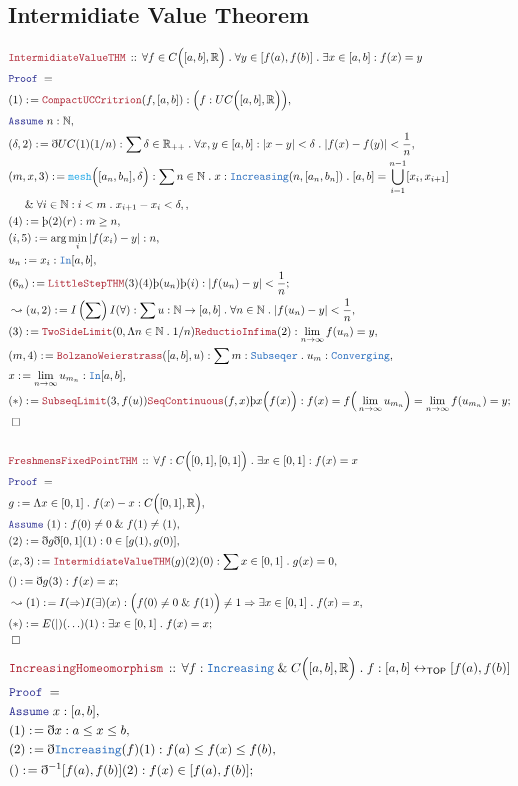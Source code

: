 \documentclass[12pt]{scrartcl}
\newcommand{\TYPE}[1]{\textcolor{NavyBlue}{\mathtt{#1}}}
\newcommand{\FUNC}[1]{\textcolor{Cerulean}{\mathtt{#1}}}
\newcommand{\LOGIC}[1]{\textcolor{Blue}{\mathtt{#1}}}
\newcommand{\THM}[1]{\textcolor{Maroon}{\mathtt{#1}}}
\renewcommand{\.}{\; . \;}
\newcommand{\de}{: \kern 0.1pc =}
\newcommand{\Theorem}[2]{& \THM{#1} \, :: \, #2 \\ & \Proof = \\ }
\newcommand{\NewLine}{\\ & \kern 1pc}
\newcommand{\Page}[1]{ \begin{align*} #1 \end{align*}   }
\newcommand{ \bd }{ \ByDef }
\renewcommand{\And}{\; \& \;}
\newcommand{\Reals}{\mathbb{R} }
\newcommand{\Nat}{\mathbb{N} }
\newcommand{\ToBij}{\leftrightarrow}
\newcommand{\Say}[3]{& #1 \de #2 : #3, \\}
\newcommand{\Conclude}[3]{& #1 \de #2 : #3; \\}
\newcommand{\Derive}[3]{& \leadsto #1 \de #2 : #3, \\}
\newcommand{\Assume}[2]{& \LOGIC{Assume} \;#1 : #2, \\}
\newcommand{\QED}{\; \square}
\newcommand{\EndProof}{& \QED \\}
\newcommand{\ByDef}{\eth}
\newcommand{\ByConstr}{\text{\thorn}}
\newcommand{\Proof}{\LOGIC{Proof} \; }
\begin{document}
\subsection{Intermidiate Value Theorem}
\Page{
	\Theorem{IntermidiateValueTHM}{\forall f \in C\Big([a,b],\Reals\Big) \. 
		\forall y \in [f(a),f(b)] \. \exists x \in [a,b] : f(x) = y }
	\Say{(1)}{\THM{CompactUCCritrion}(f,[a,b])}{\Big( f : UC\Big([a,b],\Reals\Big) \Big)}
	\Assume{n}{\Nat}
	\Say{(\delta,2)}{\bd UC(1)(1/n)}{ 
		\sum \delta \in \Reals_{++} \.  
		\forall x,y \in [a,b] : | x - y| < \delta \. |f(x) - f(y)| < \frac{1}{n} 
	}
	\Say{(m,x,3)}{\FUNC{mesh}\Big([a_n,b_n], \delta\Big)}{\sum n \in \Nat \. x : \TYPE{Increasing}(n,[a_n,b_n])
		\. [a,b] = \bigcup^{n-1}_{i=1} [x_i,x_{i+1}] 
		\NewLine
		\And \forall i \in \Nat : i  < m \. x_{i+1} - x_i < \delta,
	}
	\Say{(4)}{\ByConstr(2)(r)}{m \ge n}
	\Say{(i,5)}{ \arg \min_{i} | f(x_i) - y  |  }{n}
	\Say{u_n}{ x_i }{\TYPE{In}[a,b]}
	\Conclude{(6_n)}{ \THM{LittleStepTHM}(3)(4)\ByConstr(u_n)\ByConstr(i)}{ | f(u_n) - y| < \frac{1}{n}}
	\Derive{(u,2)}{I\left( \sum \right)I(\forall)}
	{\sum u : \Nat \to [a,b] \. \forall n \in \Nat \. | f(u_n) - y| < \frac{1}{n}}
	\Say{(3)}{\THM{TwoSideLimit}(0,\Lambda n \in \Nat \. 1/n) \THM{ReductioInfima} (2)}{\lim_{n \to \infty} f(u_n) = y}
	\Say{(m,4)}{\THM{BolzanoWeierstrass}([a,b],u)}{\sum m : \TYPE{Subseqer} \. u_m : \TYPE{Converging}}
	\Say{x}{\lim_{n \to \infty} u_{m_n}}{\TYPE{In}[a,b]}
	\Conclude{(*)}{\THM{SubseqLimit}(3,f(u))\THM{SeqContinuous}(f,x)\ByConstr x \Big( f(x) \Big)}
	{ f(x) = f\Big(\lim_{n \to \infty} u_{m_n}\Big)  = \lim_{n \to \infty} f(u_{m_n}) = y
	}
	\EndProof
	\\
	\Theorem{FreshmensFixedPointTHM}{\forall f : C\Big([0,1], [0,1] \Big) \. \exists x  \in [0,1] : f(x) = x}
	\Say{g}{\Lambda x \in [0,1] \. f(x) - x}{C\Big( [0,1] , \Reals  \Big)}
	\Assume{ (1)}{f(0) \neq 0 \And f(1) \neq (1) }
	\Say{(2)}{ \bd g \bd [0,1] (1) }{ 0 \in [g(1),g(0)]}
	\Say{(x,3)}{\THM{IntermidiateValueTHM}(g)(2)(0)}{ \sum x \in [0,1] \. g(x) = 0 }
	\Conclude{()}{\bd g (3)}{ f(x) = x}
	\Derive{(1)}{I(\Rightarrow)I(\exists)(x)}
	{ \Big( f(0) \neq 0 \And f(1)\Big) \neq 1 \Rightarrow \exists x \in [0,1] \. f(x) = x}
	\Conclude{(*)}{E(|)(\ldots)(1)}{\exists x \in [0,1] \. f(x) = x}
	\EndProof
}\Page{
	\Theorem{IncreasingHomeomorphism}{\forall f : \TYPE{Increasing} \And C\Big([a,b],\Reals\Big) \. 
		f : [a,b] \ToBij_{\mathsf{TOP}} [f(a),f(b)]
	}
	\Assume{x}{[a,b]}
	\Say{(1)}{\bd x}{a \le x \le b }
	\Say{(2)}{\bd \TYPE{Increasing}(f)(1)}{f(a) \le f(x) \le f(b)}
	\Conclude{()}{\bd^{-1} [f(a),f(b)](2)}{ f(x) \in [f(a),f(b)]}
}
\end{document}
